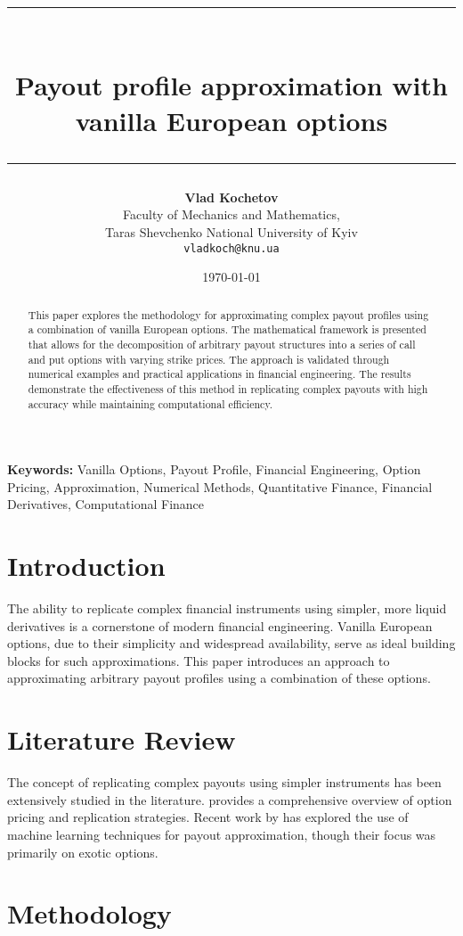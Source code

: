 \documentclass[12pt]{article}
\title{\rule{\textwidth}{4pt}\\[0.5cm]
\textbf{Payout profile approximation with vanilla European options}\\[0.5cm]
\rule{\textwidth}{2pt}}
\author{\small \textbf{Vlad Kochetov} \\
    \small Faculty of Mechanics and Mathematics, \\
    \small Taras Shevchenko National University of Kyiv \\
    \small \texttt{vladkoch@knu.ua}
}
\date{\today}
\providecommand{\keywords}[1]{\textbf{Keywords:} #1}
\begin{document}
\maketitle

\begin{abstract}
This paper explores the methodology for approximating complex payout profiles using a combination of vanilla European options. The mathematical framework is presented that allows for the decomposition of arbitrary payout structures into a series of call and put options with varying strike prices. The approach is validated through numerical examples and practical applications in financial engineering. The results demonstrate the effectiveness of this method in replicating complex payouts with high accuracy while maintaining computational efficiency.
\end{abstract}

\keywords{
    \small{
        Vanilla Options, 
        Payout Profile, 
        Financial Engineering, 
        Option Pricing, 
        Approximation, 
        Numerical Methods,
        Quantitative Finance,
        Financial Derivatives,
        Computational Finance
    }
}

\section{Introduction}
The ability to replicate complex financial instruments using simpler, more liquid derivatives is a cornerstone of modern financial engineering. Vanilla European options, due to their simplicity and widespread availability, serve as ideal building blocks for such approximations. This paper introduces an approach to approximating arbitrary payout profiles using a combination of these options.

\section{Literature Review}
The concept of replicating complex payouts using simpler instruments has been extensively studied in the literature. \cite{hull2018options} provides a comprehensive overview of option pricing and replication strategies. Recent work by \cite{smith2020financial} has explored the use of machine learning techniques for payout approximation, though their focus was primarily on exotic options.

\section{Methodology}
\end{document}
